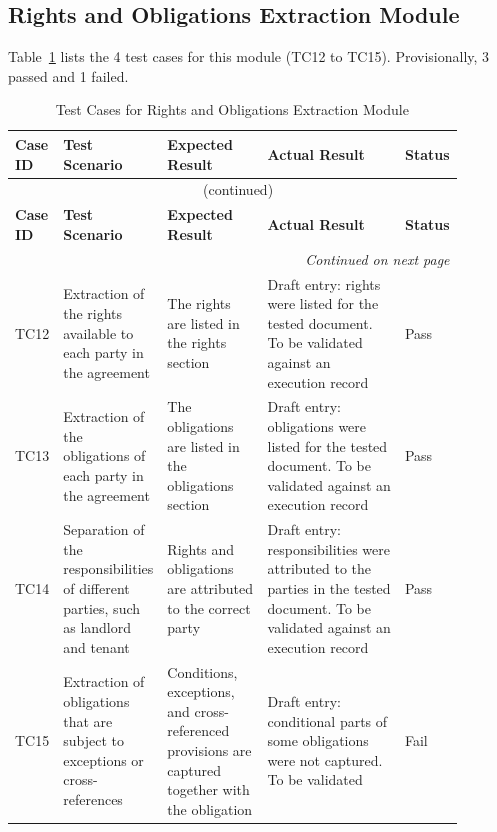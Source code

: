 \documentclass[12pt,a4paper,oneside]{report}
\begin{document}
\subsection{Rights and Obligations Extraction Module}
Table~\ref{tab:rights} lists the 4 test cases for this module (TC12 to TC15). Provisionally, 3 passed and 1 failed.
{\footnotesize
\setlength{\tabcolsep}{3pt}
\renewcommand{\arraystretch}{1.15}
\begin{longtable}{|p{0.075\linewidth}|p{0.19\linewidth}|p{0.23\linewidth}|p{0.32\linewidth}|p{0.08\linewidth}|}
\caption{Test Cases for Rights and Obligations Extraction Module}\label{tab:rights}\\
\hline
\textbf{Case ID} & \textbf{Test Scenario} & \textbf{Expected Result} & \textbf{Actual Result} & \textbf{Status}\\
\hline
\endfirsthead
\multicolumn{5}{c}{\tablename~\thetable{} (continued)}\\
\hline
\textbf{Case ID} & \textbf{Test Scenario} & \textbf{Expected Result} & \textbf{Actual Result} & \textbf{Status}\\
\hline
\endhead
\hline
\multicolumn{5}{r}{\emph{Continued on next page}}\\
\endfoot
\hline
\endlastfoot
TC12 & Extraction of the rights available to each party in the agreement & The rights are listed in the rights section & Draft entry: rights were listed for the tested document. To be validated against an execution record & Pass\\
\hline
TC13 & Extraction of the obligations of each party in the agreement & The obligations are listed in the obligations section & Draft entry: obligations were listed for the tested document. To be validated against an execution record & Pass\\
\hline
TC14 & Separation of the responsibilities of different parties, such as landlord and tenant & Rights and obligations are attributed to the correct party & Draft entry: responsibilities were attributed to the parties in the tested document. To be validated against an execution record & Pass\\
\hline
TC15 & Extraction of obligations that are subject to exceptions or cross-references & Conditions, exceptions, and cross-referenced provisions are captured together with the obligation & Draft entry: conditional parts of some obligations were not captured. To be validated & Fail\\
\end{longtable}
}
\end{document}
